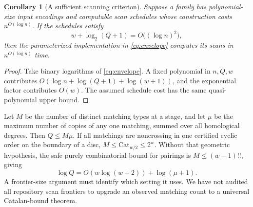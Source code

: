 \documentclass[11pt,letterpaper]{article}
\newtheorem{corollary}[theorem]{Corollary}
\theoremstyle{definition}
\theoremstyle{remark}
\begin{document}
\begin{corollary}[A sufficient scanning criterion]
\label{cor:scanqp}
Suppose a family has polynomial-size input encodings and computable scan
schedules whose construction costs $n^{O(\log n)}$. If the schedules satisfy
\[
 w+\log_2(Q+1)=O\bigl((\log n)^2\bigr),
\]
then the parameterized implementation in \eqref{eq:envelope} computes its
scans in $n^{O(\log n)}$ time.
\end{corollary}
\begin{proof}
Take binary logarithms of \eqref{eq:envelope}. A fixed polynomial in
$n,Q,w$ contributes $O(\log n+\log(Q+1)+\log(w+1))$, and the exponential
factor contributes $O(w)$. The assumed schedule cost has the same
quasi-polynomial upper bound.
\end{proof}

Let $M$ be the number of distinct matching types at a stage, and let $\mu$
be the maximum number of copies of any one matching, summed over all
homological degrees. Then $Q\leq M\mu$. If all matchings are noncrossing in
one certified cyclic order on the boundary of a disc,
$M\leq \mathrm{Cat}_{w/2}\leq2^w$. Without that geometric hypothesis, the
safe purely combinatorial bound for pairings is
$M\leq(w-1)!!$, giving
\[
 \log Q=O(w\log(w+2))+\log(\mu+1).
\]
A frontier-size argument must identify which setting it uses. We have not
audited all repository scan frontiers to upgrade an observed matching
count to a universal Catalan-bound theorem.
\end{document}
